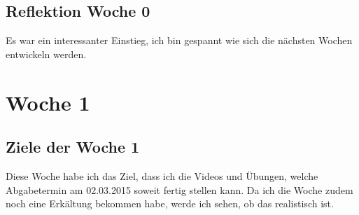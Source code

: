 \documentclass[12pt,a4paper,bibliography=totocnumbered,listof=totocnumbered]{scrartcl}
\begin{document}
\subsection{Reflektion Woche 0}
Es war ein interessanter Einstieg, ich bin gespannt wie sich die nächsten Wochen entwickeln werden. 
\pagebreak

\section{Woche 1}

\subsection{Ziele der Woche 1}
Diese Woche habe ich das Ziel, dass ich die Videos und Übungen, welche Abgabetermin am 02.03.2015 soweit fertig stellen kann. Da ich die Woche zudem noch eine Erkältung bekommen habe, werde ich sehen, ob das realistisch ist.
\end{document}
